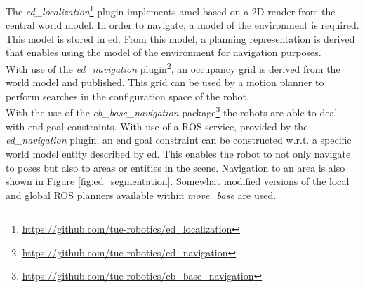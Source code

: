 The \emph{ed\_localization}\footnote{\url{https://github.com/tue-robotics/ed_localization}} plugin implements \acrshort{amcl} based on a 2D render from the central world model. In order to navigate, a model of the environment is required. This model is stored in \acrshort{ed}. From this model, a planning representation is derived that enables using the model of the environment for navigation purposes.
\\
With use of the \emph{ed\_navigation} plugin\footnote{\url{https://github.com/tue-robotics/ed_navigation}}, an occupancy grid is derived from the world model and published. This grid can be used by a motion planner to perform searches in the configuration space of the robot.
\\
With the use of the \emph{cb\_base\_navigation} package\footnote{\url{https://github.com/tue-robotics/cb_base_navigation}} the robots are able to deal with end goal constraints. With use of a ROS service, provided by the \emph{ed\_navigation} plugin, an end goal constraint can be constructed w.r.t. a specific world model entity described by \acrshort{ed}. This enables the robot to not only navigate to poses but also to areas or entities in the scene. Navigation to an area is also shown in Figure \ref{fig:ed_segmentation}.
Somewhat modified versions of the local and global ROS planners available within \emph{move\_base} are used.
